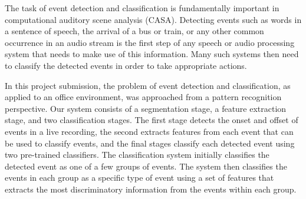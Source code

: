 The task of event detection and classification is fundamentally important in computational auditory scene analysis (CASA). Detecting events such as words in a sentence of speech, the arrival of a bus or train, or any other common occurrence in an audio stream is the first step of any speech or audio processing system that needs to make use of this information. Many such systems then need to classify the detected events in order to take appropriate actions.

In this project submission, the problem of event detection and classification, as applied to an office environment, was approached from a pattern recognition perspective. Our system consists of a segmentation stage, a feature extraction stage, and two classification stages. The first stage detects the onset and offset of events in a live recording, the second extracts features from each event that can be used to classify events, and the final stages classify each detected event
using two pre-trained classifiers. The classification system initially classifies the detected event as one of a few groups of events. The system then classifies the events in each group as a specific type of event using a set of features that extracts the most discriminatory information from the events within each group.
